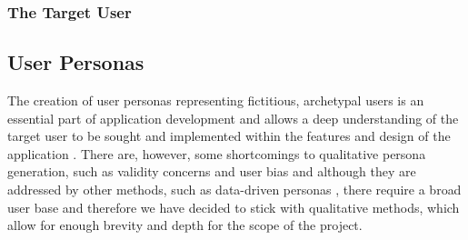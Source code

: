 \documentclass[12pt]{article}
\begin{document}
	\subsubsection{The Target User}
	

	
	
	\subsection{User Personas}
	The creation of user personas representing fictitious, archetypal users is an essential part of application development \cite{Grudin and Pruitt, 2002} and allows a deep understanding of the target user to be sought and implemented within the features and design of the application \cite{Long, 2009}. There are, however, some shortcomings to qualitative persona generation, such as validity concerns and user bias \cite{Chapman and Milham, 2007} and although they are addressed by other methods, such as data-driven personas \cite{Mcginn and Kotamraju, 2008}, there require a broad user base and therefore we have decided to stick with qualitative methods, which allow for enough brevity and depth for the scope of the project.
	
\end{document}
